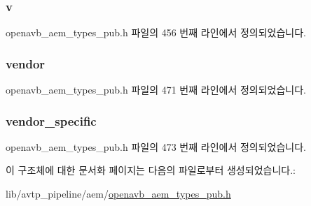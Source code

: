 \subsubsection[{\texorpdfstring{v}{v}}]{ v}\hypertarget{structopenavb__aem__stream__format__t_aa2e280b5ed1972cee1efa1e710dcab29}{}\label{structopenavb__aem__stream__format__t_aa2e280b5ed1972cee1efa1e710dcab29}


openavb\+\_\+aem\+\_\+types\+\_\+pub.\+h 파일의 456 번째 라인에서 정의되었습니다.

\subsubsection[{\texorpdfstring{vendor}{vendor}}]{ vendor}\hypertarget{structopenavb__aem__stream__format__t_abe3fa7c528292c33e301ca728ad10258}{}\label{structopenavb__aem__stream__format__t_abe3fa7c528292c33e301ca728ad10258}


openavb\+\_\+aem\+\_\+types\+\_\+pub.\+h 파일의 471 번째 라인에서 정의되었습니다.

\subsubsection[{\texorpdfstring{vendor\+\_\+specific}{vendor_specific}}]{ vendor\+\_\+specific}\hypertarget{structopenavb__aem__stream__format__t_aab4b01b1214d2048a1a5bd2ac6d02bbb}{}\label{structopenavb__aem__stream__format__t_aab4b01b1214d2048a1a5bd2ac6d02bbb}


openavb\+\_\+aem\+\_\+types\+\_\+pub.\+h 파일의 473 번째 라인에서 정의되었습니다.



이 구조체에 대한 문서화 페이지는 다음의 파일로부터 생성되었습니다.\+:\begin{DoxyCompactItemize}
\item 
lib/avtp\+\_\+pipeline/aem/\hyperlink{openavb__aem__types__pub_8h}{openavb\+\_\+aem\+\_\+types\+\_\+pub.\+h}\end{DoxyCompactItemize}
